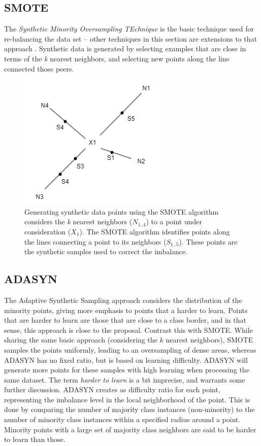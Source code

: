\documentclass[letterpaper]{article}
\begin{document}
 
\subsection{SMOTE}
The \textit{Synthetic Minority Oversampling TEchnique} is the basic technique used for re-balancing the data set -- other techniques in this section are extensions to that approach \parencite{Chawla2002-dk}. Synthetic data is generated by selecting examples that are close in terms of the \textit{k} nearest neighbors, and selecting new points along the line connected those peers.
\begin{figure}[H]
	\centering
	\includegraphics[scale=0.35]{./figures/smote.png}
	\caption[SMOTE selection of synthetic data points]{Generating synthetic data points using the SMOTE algorithm considers the \textit{k} nearest neighbors ($N_{1..4}$) to a point under consideration ($X_1$).  The SMOTE algorithm identifies points along the lines connecting a point to its neighbors ($S_{1..5}$). These points are the synthetic samples used to correct the imbalance.}
	\label{fig:smote}
\end{figure}

\subsection{ADASYN}
The Adaptive Synthetic Sampling approach considers the distribution of the minority points, giving more emphasis to points that a harder to learn. \parencite{He2008-xr} Points that are harder to learn are those that are close to a class border, and in that sense, this approach is close to the  proposal. Contrast this with SMOTE. While sharing the same basic approach (considering the $k$ nearest neighbors), SMOTE samples the points uniformly, leading to an oversampling of dense areas, whereas ADASYN has no fixed ratio, but is based on learning difficulty. ADASYN will generate more points for these samples with high learning when processing the same dataset. The term \textit{harder to learn} is a bit imprecise, and warrants some further discussion. ADASYN creates as difficulty ratio for each point, representing the imbalance level in the local neighborhood of the point. This is done by comparing the number of majority class instances (non-minority) to the number of minority class instances within a specified radius around a point. Minority points with a large set of majority class neighbors are said to be harder to learn than those.
\end{document}
